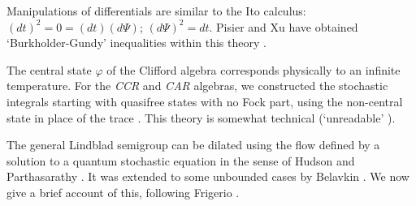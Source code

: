 Manipulations of differentials
are similar to the Ito calculus: $(dt)^2=0=(dt)(d\Psi)$; $(d\Psi)^2=dt$.
Pisier and Xu have obtained `Burkholder-Gundy' inequalities
within this theory \cite{Pisier}.

The central state $\varphi$ of the Clifford algebra corresponds physically
to an infinite temperature.
For the {\em CCR} and {\em CAR} algebras, we constructed the stochastic
integrals starting with quasifree states with no Fock part, using the
non-central state in place of the trace \cite{Barnett4,Lindsay}. This theory
is somewhat technical (`unreadable' \cite{Meyer2}).

The general Lindblad semigroup can be dilated \cite{Evans}
using the flow defined by a solution to a quantum stochastic equation in
the sense of Hudson and Parthasarathy \cite{Hudson3,Partha2,Smith}.
It was extended to some unbounded cases by Belavkin \cite{Belavkin}.
We now give a brief account of this, following Frigerio \cite{Frigerio}.

